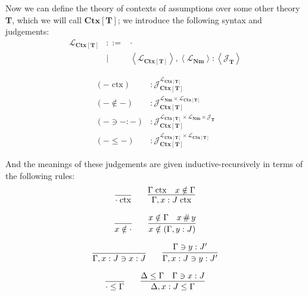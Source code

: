 \documentclass{amsart}
\theoremstyle{definition}
\theoremstyle{remark}
\numberwithin{equation}{section}
\newcommand{\quo}[1]{\left\langle#1\right\rangle}
\begin{document}
Now we can define the theory of contexts of assumptions over some other theory
$\mathbf{T}$, which we will call $\mathbf{Ctx}[\mathbf{T}]$; we introduce the
following syntax and judgements:
\[
  \begin{array}{lcl}
    \mathcal{L}_{\mathbf{Ctx}[\mathbf{T}]}
      &::= &\cdot\\
      &\mid & \quo{\mathcal{L}_{\mathbf{Ctx}[\mathbf{T}]}},\quo{\mathcal{L}_\mathbf{Nm}}:\quo{\mathcal{J}_\mathbf{T}}
  \end{array}
\]

\begin{align*}
  (-\;\mathrm{ctx}) &: \mathcal{J}_{\mathbf{Ctx}[\mathbf{T}]}^{\mathcal{L}_{\mathbf{Ctx}[\mathbf{T}]}}\\
  (-\notin-) &: \mathcal{J}_{\mathbf{Ctx}[\mathbf{T}]}^{\mathcal{L}_\mathbf{Nm}\times\mathcal{L}_{\mathbf{Ctx}[\mathbf{T}]}}\\
  (-\ni-:-) &: \mathcal{J}_{\mathbf{Ctx}[\mathbf{T}]}^{\mathcal{L}_{\mathbf{Ctx}[\mathbf{T}]}\times\mathcal{L}_\mathbf{Nm}\times\mathcal{J}_\mathbf{T}}\\
  (-\leq-) &: \mathcal{J}_{\mathbf{Ctx}[\mathbf{T}]}^{\mathcal{L}_{\mathbf{Ctx}[\mathbf{T}]}\times\mathcal{L}_{\mathbf{Ctx}[\mathbf{T}]}}
\end{align*}

And the meanings of these judgements are given inductive-recursively in terms of the
following rules:
\begin{gather*}
  \infer{\cdot\;\mathrm{ctx}}{}
  \qquad
  \infer{
    \Gamma,x:J\;\mathrm{ctx}
  }{
    \Gamma\;\mathrm{ctx}
    & x\notin\Gamma
  }\\[6pt]
  \infer{x\notin\cdot}{}
  \qquad
  \infer{
    x\notin(\Gamma,y:J)
  }{
    x\notin\Gamma
    & x\mathop{\#}y
  }\\[6pt]
  \infer{\Gamma,x:J\ni x:J}{}
  \qquad
  \infer{
    \Gamma,x:J\ni y:J'
  }{
    \Gamma\ni y:J'
  }\\[6pt]
  \infer{\cdot\leq\Gamma}{}
  \qquad
  \infer{
    \Delta,x:J\leq\Gamma
  }{
    \Delta\leq\Gamma &
    \Gamma\ni x:J
  }
\end{gather*}
\end{document}
